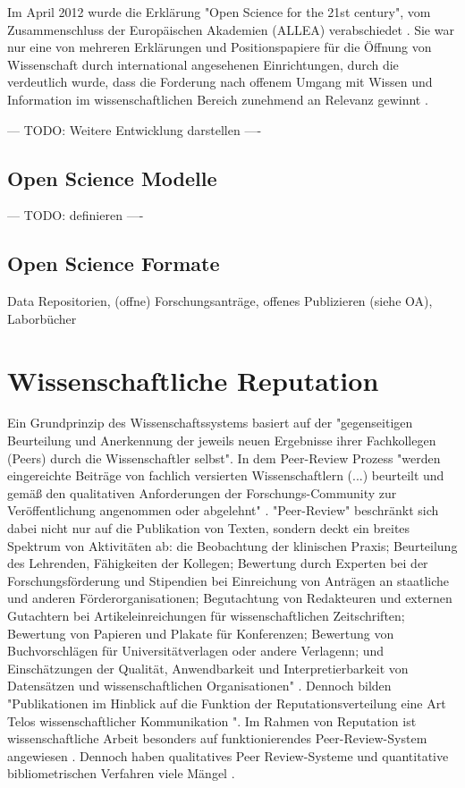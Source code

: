 Im April 2012 wurde die Erklärung "Open Science for the 21st century", vom Zusammenschluss der Europäischen Akademien (ALLEA) verabschiedet \cite{ALLEA_2012}. Sie war nur eine von mehreren Erklärungen und Positionspapiere für die Öffnung von Wissenschaft durch international angesehenen Einrichtungen, durch die verdeutlich wurde, dass die Forderung nach offenem Umgang mit Wissen und Information im wissenschaftlichen Bereich zunehmend an Relevanz gewinnt \cite{schulze_2013_open}.

--- TODO: Weitere Entwicklung darstellen ----

\subsection{Open Science Modelle}
--- TODO: definieren ----
\subsection{Open Science Formate}
Data Repositorien, (offne) Forschungsanträge, offenes Publizieren (siehe OA), Laborbücher

\section{Wissenschaftliche Reputation}
Ein Grundprinzip des Wissenschaftssystems basiert auf der "gegenseitigen Beurteilung und Anerkennung der jeweils neuen Ergebnisse ihrer Fachkollegen (Peers) durch die Wissenschaftler selbst"\cite{Hanekop_2014}. In dem Peer-Review Prozess "werden eingereichte Beiträge von fachlich versierten Wissenschaftlern (...) beurteilt und gemäß den qualitativen Anforderungen der Forschungs-Community zur Veröffentlichung angenommen oder abgelehnt" \cite{Hess_2006}. "Peer-Review" beschränkt sich dabei nicht nur auf die Publikation von Texten, sondern deckt ein breites Spektrum von Aktivitäten ab: die Beobachtung der klinischen Praxis; Beurteilung des Lehrenden, Fähigkeiten der Kollegen; Bewertung durch Experten bei der Forschungsförderung und Stipendien bei Einreichung von Anträgen an staatliche und anderen Förderorganisationen; Begutachtung von Redakteuren und externen Gutachtern bei Artikeleinreichungen für wissenschaftlichen Zeitschriften; Bewertung von Papieren und Plakate für Konferenzen; Bewertung von Buchvorschlägen für Universitätverlagen oder andere Verlagenn; und Einschätzungen der Qualität, Anwendbarkeit und Interpretierbarkeit von Datensätzen und wissenschaftlichen Organisationen" \cite{Lee_2012}. Dennoch bilden "Publikationen im Hinblick auf die Funktion der Reputationsverteilung eine Art Telos wissenschaftlicher Kommunikation "\cite{hirschauer2004peer}. Im Rahmen von Reputation ist wissenschaftliche Arbeit besonders auf funktionierendes Peer-Review-System angewiesen \cite{suchen}. Dennoch haben qualitatives Peer Review-Systeme und quantitative bibliometrischen Verfahren viele Mängel\cite{osterloh2008anreize} \cite{Lee_2012}.

